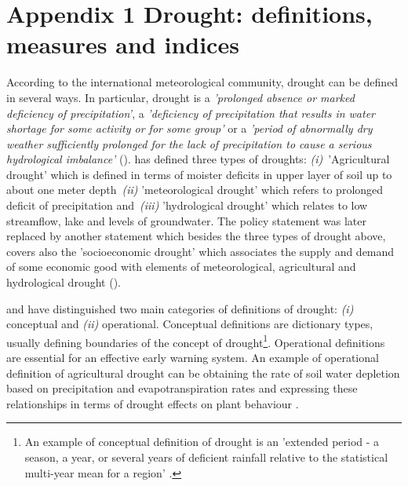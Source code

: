 \documentclass[a4paper,12pt]{article}
\begin{document}
\pagebreak








\makeatletter 
\renewcommand{\thesection}{\hspace*{-1.0em}}
\newpage
\linespread{1}

%


\newpage


\setcounter{table}{0} 
\makeatletter 
\renewcommand{\thetable}{A\@arabic \c@table} 
\FloatBarrier


\section{Appendix 1 Drought: definitions, measures and indices}
According to the international meteorological community, drought can be defined in several ways. In particular, drought is a \textit{'prolonged absence or marked deficiency of precipitation'}, a \textit{'deficiency of precipitation that results in water shortage for some activity or for some group'} or a \textit{'period of abnormally dry weather sufficiently prolonged for the lack of precipitation to cause a serious hydrological imbalance'} (\citealp{Heim2002, IPCCtrenberth}).
 \cite{AMS1997} has defined three types of droughts: \textit{(i)}~'Agricultural drought' which is defined in terms of moister deficits in upper layer of soil up to about one meter depth~\textit{(ii)} 'meteorological drought' which refers to prolonged deficit of precipitation and~\textit{(iii)} 'hydrological drought' which relates to low streamflow, lake and levels of groundwater. The  \cite{AMS1997} policy statement was later replaced by another statement \citep{AMS2013} which besides the three types of drought above, covers also the 'socioeconomic drought' which associates the supply and demand of some economic good with elements of meteorological, agricultural and hydrological drought (\citealt{Heim2002, IPCCtrenberth}).
 
\cite{wilhite1985} and \cite{wilhite2000} have distinguished two main categories of definitions of drought: \textit{(i)} conceptual and \textit{(ii)} operational. Conceptual definitions are dictionary types, usually defining boundaries of the concept of drought\footnote{An example of conceptual definition of drought is an 'extended period - a season, a year, or several years of deficient rainfall relative to the statistical multi-year mean for a region' \cite{schneider1996}.}. Operational definitions are essential for an effective early warning system. An example of operational definition of agricultural drought can be obtaining the rate of soil water depletion based on precipitation and evapotranspiration rates and expressing these relationships in terms of drought effects on plant behaviour \citep{wilhite2000}.
\end{document}
